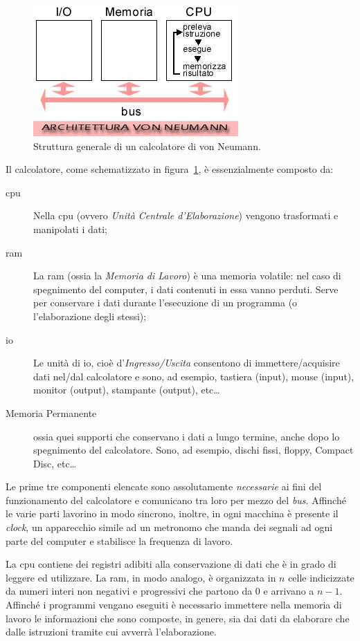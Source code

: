 \begin{figure}
	\centering
\includegraphics[width=0.45\columnwidth]{immagini/von_neumann}
	\caption[Calcolatore di von Neumann]{Struttura generale di un calcolatore di von Neumann.}
	\label{fig:neu}
\end{figure}
Il calcolatore, come schematizzato in figura~\ref{fig:neu}, è essenzialmente composto da:
\begin{description}
	\item
[\ac{cpu}] Nella \ac{cpu} (ovvero \emph{Unità Centrale d'Elaborazione}) vengono  trasformati e manipolati i dati;
	\item
[\ac{ram}] La \ac{ram} (ossia la \emph{Memoria di Lavoro}) è una memoria volatile: nel caso di spegnimento del computer, i dati contenuti in essa vanno perduti.
Serve per conservare i dati durante l'esecuzione di un programma (o l'elaborazione degli stessi);
	\item
[\ac{io}] Le unità di \ac{io}, cioè d'\emph{Ingresso/Uscita} consentono di immettere/acquisire dati nel/dal calcolatore e sono, ad esempio, tastiera (input), mouse (input), monitor (output), stampante (output), etc\dots
	\item
[Memoria Permanente] ossia quei supporti che conservano i dati a lungo termine, anche dopo lo spegnimento del calcolatore. Sono, ad esempio, dischi fissi, floppy, Compact Disc, etc\dots
\end{description}
Le prime tre componenti elencate sono assolutamente \emph{necessarie} ai fini del funzionamento del calcolatore e comunicano tra loro per mezzo del \emph{bus}.
Affinché le varie parti lavorino in modo sincrono, inoltre, in ogni macchina è presente il \emph{clock}, un apparecchio simile ad un metronomo che manda dei segnali ad ogni parte del computer e stabilisce la frequenza di lavoro.



La \ac{cpu} contiene dei registri adibiti alla conservazione di dati che è in grado di leggere ed utilizzare.
La \ac{ram}, in modo analogo, è organizzata in $n$ celle indicizzate da numeri interi non negativi e progressivi che partono da \num{0} e arrivano a $n-1$.
Affinché i programmi vengano eseguiti è necessario immettere nella memoria di lavoro le informazioni che sono composte, in genere, sia dai dati da elaborare che dalle istruzioni tramite cui avverrà l'elaborazione.

